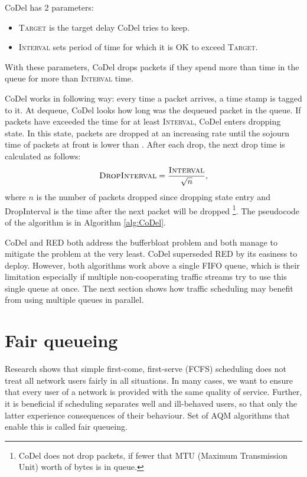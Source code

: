 CoDel has 2 parameters:
\begin{itemize}
	\item \textsc{Target} is the target delay CoDel tries to keep.
	\item \textsc{Interval} sets period of time for which it is OK to exceed \textsc{Target}.
\end{itemize}
With these parameters, CoDel drops packets if they spend more than  time in the queue for more than \textsc{Interval} time.

CoDel works in following way: every time a packet arrives, a time stamp is tagged to it. At dequeue, CoDel looks how long was the dequeued packet in the queue. If packets have exceeded the  time for at least \textsc{Interval}, CoDel enters dropping state. In this state, packets are dropped at an increasing rate until the sojourn time of packets at front is lower than . After each drop, the next drop time is calculated as follows:
\[
  \textsc{DropInterval} = \frac{\textsc{Interval}}{\sqrt{n}},
\]
where $n$ is the number of packets dropped since dropping state entry and DropInterval is the time after the next packet will be dropped \footnote{CoDel does not drop packets, if fewer that MTU (Maximum Transmission Unit) worth of bytes is in queue.}. The pseudocode of the algorithm is in Algorithm \ref{alg:CoDel}.

CoDel and RED both address the bufferbloat problem and both manage to mitigate the problem at the very least. CoDel superseded RED by its easiness to deploy. However, both algorithms work above a single FIFO queue, which is their limitation especially if multiple non-cooperating traffic streams try to use this single queue at once. The next section shows how traffic scheduling may benefit from using multiple queues in parallel.

\section{Fair queueing}
\label{sec:fair_queueing}
Research shows \cite{Nagle:FQ} that simple first-come, first-serve (FCFS) scheduling does not treat all network users fairly in all situations. In many cases, we want to ensure that every user of a network is provided with the same quality of service. Further, it is beneficial if scheduling separates well and ill-behaved users, so that only the latter experience consequences of their behaviour. Set of AQM algorithms that enable this is called fair queueing.


